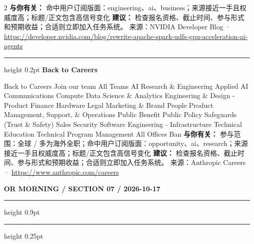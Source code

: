 \documentclass[10.5pt]{ctexart}
\begin{document}
\begin{multicols}{2}
\textbf{与你有关：} 命中用户订阅版面：engineering、ai、business；来源接近一手且权威度高；标题/正文包含高信号变化
\textbf{建议：} 检查报名资格、截止时间、参与形式和预期收益；合适则立即加入任务系统。
{\footnotesize\color{ormuted} 来源：NVIDIA Developer Blog · \url{https://developer.nvidia.com/blog/rewrite-apache-spark-udfs-gpu-acceleration-ai-agents}}
\vspace{2mm}
\hrule height 0.2pt
\vspace{2mm}
{\large\bfseries Back to Careers}\par
Back to Careers Join our team All Teams AI Research \& Engineering Applied AI Communications Compute Data Science \& Analytics Engineering \& Design - Product Finance Hardware Legal Marketing \& Brand People Product Management, Support, \& Operations Public Benefit Public Policy Safeguards (Trust \& Safety) Sales Security Software Engineering - Infrastructure Technical Education Technical Program Management All Offices Ban
\textbf{与你有关：} 参与范围：全球 / 多为海外全职；命中用户订阅版面：opportunity、ai、research；来源接近一手且权威度高；标题/正文包含高信号变化
\textbf{建议：} 检查报名资格、截止时间、参与形式和预期收益；合适则立即加入任务系统。
{\footnotesize\color{ormuted} 来源：Anthropic Careers · \url{https://www.anthropic.com/careers}}
\end{multicols}
\newpage
{\small\bfseries OR MORNING / SECTION 07 / 2026-10-17}
\vspace{2mm}
\hrule height 0.9pt
\vspace{1.5mm}
\hrule height 0.25pt
\vspace{4mm}
\end{document}
